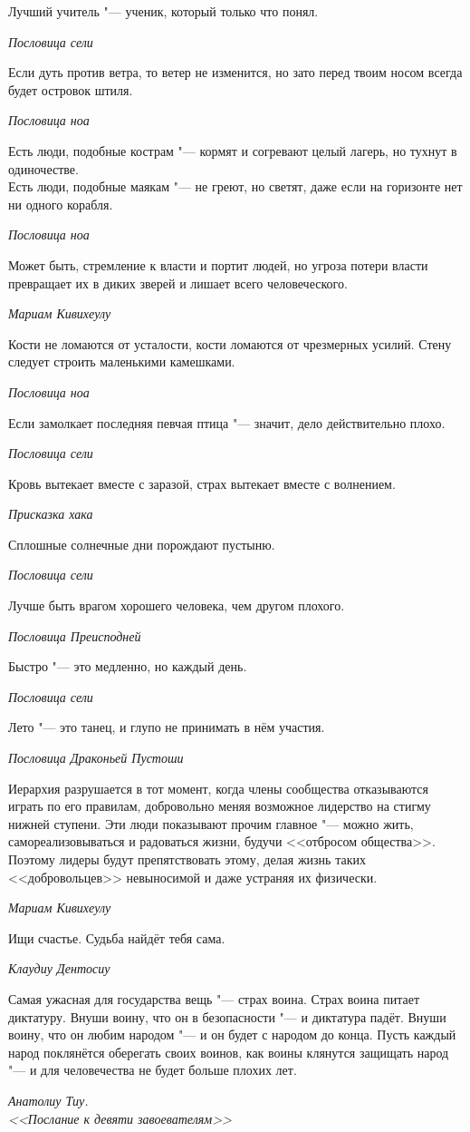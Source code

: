 \documentclass[a4paper,10pt,fleqn]{book}
\begin{document}
\epigraph{Лучший учитель "--- ученик, который только что понял.}
{\textit{Пословица сели}}

\epigraph{Если дуть против ветра, то ветер не изменится, но зато перед твоим носом всегда будет островок штиля.}
{\textit{Пословица ноа}}

\epigraph{Есть люди, подобные кострам "--- кормят и согревают целый лагерь, но тухнут в одиночестве.\\
Есть люди, подобные маякам "--- не греют, но светят, даже если на горизонте нет ни одного корабля.}
{\textit{Пословица ноа}}

\epigraph{Может быть, стремление к власти и портит людей, но угроза потери власти превращает их в диких зверей и лишает всего человеческого.}
{\textit{Мариам Кивихеулу}}

\epigraph{Кости не ломаются от усталости, кости ломаются от чрезмерных усилий.
Стену следует строить маленькими камешками.}
{\textit{Пословица ноа}}

\epigraph{Если замолкает последняя певчая птица "--- значит, дело действительно плохо.}
{\textit{Пословица сели}}

\epigraph{Кровь вытекает вместе с заразой, страх вытекает вместе с волнением.}
{\textit{Присказка хака}}

\epigraph{Сплошные солнечные дни порождают пустыню.}
{\textit{Пословица сели}}

\epigraph{Лучше быть врагом хорошего человека, чем другом плохого.}
{\textit{Пословица Преисподней}}

\epigraph{Быстро "--- это медленно, но каждый день.}
{\textit{Пословица сели}}

\epigraph{Лето "--- это танец, и глупо не принимать в нём участия.}
{\textit{Пословица Драконьей Пустоши}}

\epigraph{Иерархия разрушается в тот момент, когда члены сообщества отказываются играть по его правилам, добровольно меняя возможное лидерство на стигму нижней ступени.
Эти люди показывают прочим главное "--- можно жить, самореализовываться и радоваться жизни, будучи <<отбросом общества>>.
Поэтому лидеры будут препятствовать этому, делая жизнь таких <<добровольцев>> невыносимой и даже устраняя их физически.}
{\textit{Мариам Кивихеулу}}

\epigraph{Ищи счастье.
Судьба найдёт тебя сама.}
{\textit{Клаудиу Дентосиу}}

\epigraph{Самая ужасная для государства вещь "--- страх воина.
Страх воина питает диктатуру.
Внуши воину, что он в безопасности "--- и диктатура падёт.
Внуши воину, что он любим народом "--- и он будет с народом до конца.
Пусть каждый народ поклянётся оберегать своих воинов, как воины клянутся защищать народ "--- и для человечества не будет больше плохих лет.}
{\textit{Анатолиу Тиу.\\<<Послание к девяти завоевателям>>}}
\end{document}

